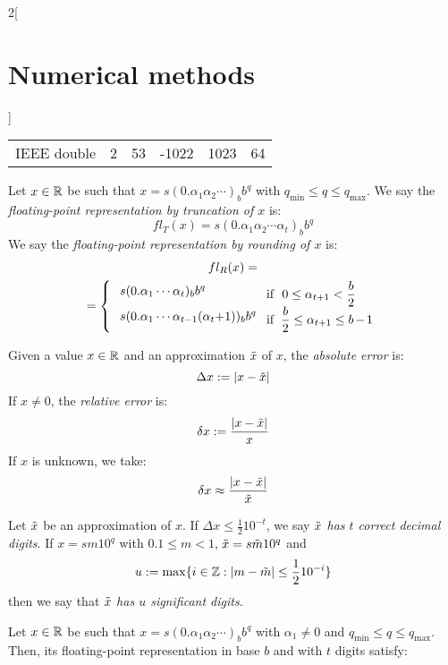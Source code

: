 \documentclass[../../../main.tex]{subfiles}
\begin{document}
\begin{multicols}{2}[\section{Numerical methods}]
\begin{center}
\begin{minipage}{\linewidth}
\begin{tabular}{c|ccccc}
                IEEE double & 2   & 53  & -1022          & 1023           & 64
            \end{tabular}
        \end{minipage}
    \end{center}
    \begin{definition}
        Let $x\in\mathbb{R}$ be such that $x=s(0.\alpha_1\alpha_2\cdots)_bb^q$ with $q_\text{min}\leq q\leq q_\text{max}$. We say the \textit{floating-point representation by truncation of $x$} is: $$fl_T(x)=s(0.\alpha_1\alpha_2\cdots\alpha_t)_bb^q$$ We say the \textit{floating-point representation by rounding of $x$} is:
        \begin{multline*}
            fl_R(x)=\\=\left\{\text{\setlength{\tabcolsep}{4pt}
                \begin{tabular}{m{3.85cm}m{3cm}}
                    $s(0.\alpha_1\cdots\alpha_t)_bb^q$                 & if $\ 0\leq\alpha_{t+1}<\frac{b}{2}$       \\
                    $s(0.\alpha_1\cdots\alpha_{t-1}(\alpha_t+1))_bb^q$ & if $\ \frac{b}{2}\leq\alpha_{t+1}\leq b-1$
                \end{tabular}}\right.
        \end{multline*}
    \end{definition}
    \begin{definition}
        Given a value $x\in\mathbb{R}$ and an approximation $\Tilde{x}$ of $x$, the \textit{absolute error} is: $$\Delta x:=|x-\Tilde{x}|$$ If $x\ne 0$, the \textit{relative error} is: $$\delta x:=\frac{|x-\Tilde{x}|}{x}$$ If $x$ is unknown, we take: $$\delta x\approx\frac{|x-\Tilde{x}|}{\Tilde{x}}$$
    \end{definition}
    \begin{definition}
        Let $\Tilde{x}$ be an approximation of $x$. If $\Delta x\leq\frac{1}{2}10^{-t}$, we say \textit{$\Tilde{x}$ has $t$ correct decimal digits}. If $x=sm10^q$ with $0.1\leq m<1$, $\Tilde{x}=s\Tilde{m}10^q$ and $$u:=\max\{i\in\mathbb{Z}:|m-\Tilde{m}|\leq\frac{1}{2}10^{-i}\}$$ then we say that $\Tilde{x}$ \textit{has $u$ significant digits}.
    \end{definition}
    \begin{prop}
        Let $x\in\mathbb{R}$ be such that $x=s(0.\alpha_1\alpha_2\cdots)_bb^q$ with $\alpha_1\ne0$ and $q_\text{min}\leq q\leq q_\text{max}$. Then, its floating-point representation in base $b$ and with $t$ digits satisfy:

\end{prop}
\end{multicols}
\end{document}
